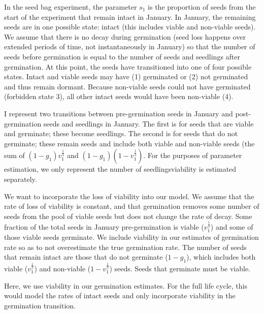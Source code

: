 \documentclass[12pt, oneside, titlepage]{article}   	%
\begin{document}
In the seed bag experiment, the parameter $s_1$ is the proportion of seeds from the start of the experiment that remain intact in January. In January, the remaining seeds are in one possible state: intact (this includes viable and non-viable seeds). We assume that there is no decay during germination (seed loss happens over extended periods of time, not instantaneously in January) so that the number of seeds before germination is equal to the number of seeds and seedlings after germination. At this point, the seeds have transitioned into one of four possible states. Intact and viable seeds may have (1) germinated or (2) not germinated and thus remain dormant. Because non-viable seeds could not have germinated (forbidden state 3), all other intact seeds would have been non-viable (4). 

I represent two transitions between pre-germination seeds in January and post-germination seeds and seedlings in January. The first is for seeds that are viable and germinate; these become seedlings. The second is for seeds that do not germinate; these remain seeds and include both viable and non-viable seeds (the sum of $(1-g_1)v_1^{\frac{1}{3}}$ and $(1-g_1)(1-v_1^{\frac{1}{3}})$. For the purposes of parameter estimation, we only represent the number of seedlings\textemdash viability is estimated separately. 

We want to incorporate the loss of viability into our model. We assume that the rate of loss of viability is constant, and that germination removes some number of seeds from the pool of viable seeds but does not change the rate of decay. Some fraction of the total seeds in January pre-germination is viable ($v_1^{\frac{1}{3}}$) and some of those viable seeds germinate. We include viability in our estimates of germination rate so as to not overestimate the true germination rate. The number of seeds that remain intact are those that do not germinate ($1-g_1$), which includes both viable ($v_1^{\frac{1}{3}}$) and non-viable ($1-v_1^{\frac{1}{3}}$) seeds. Seeds that germinate must be viable. 

Here, we use viability in our germination estimates. For the full life cycle, this would model the rates of intact seeds and only incorporate viability in the germination transition. 
\end{document}
